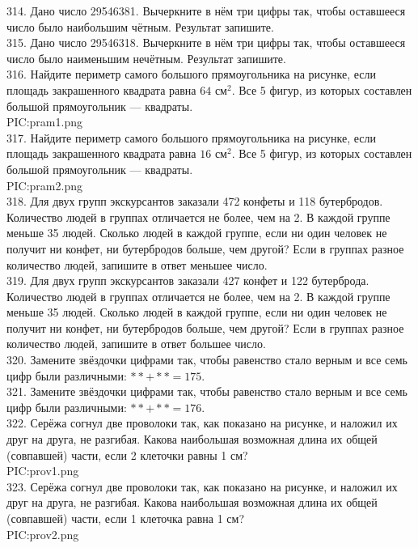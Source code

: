 314. Дано число 29546381. Вычеркните в нём три цифры так, чтобы оставшееся число было наибольшим чётным. Результат запишите.\\
315. Дано число 29546318. Вычеркните в нём три цифры так, чтобы оставшееся число было наименьшим нечётным. Результат запишите.\\
316. Найдите периметр самого большого прямоугольника на рисунке, если площадь закрашенного квадрата равна $64\text{ см}^2.$ Все 5 фигур, из которых составлен большой прямоугольник --- квадраты.\\
{{PIC:pram1.png}}\\
317. Найдите периметр самого большого прямоугольника на рисунке, если площадь закрашенного квадрата равна $16\text{ см}^2.$ Все 5 фигур, из которых составлен большой прямоугольник --- квадраты.\\
{{PIC:pram2.png}}\\
318. Для двух групп экскурсантов заказали 472 конфеты и 118 бутербродов. Количество людей в группах отличается не более, чем на 2. В каждой группе меньше 35 людей. Сколько людей в каждой группе, если ни один человек не получит ни конфет, ни бутербродов больше, чем другой? Если в группах разное количество людей, запишите в ответ меньшее число.\\
319. Для двух групп экскурсантов заказали 427 конфет и 122 бутерброда. Количество людей в группах отличается не более, чем на 2. В каждой группе меньше 35 людей. Сколько людей в каждой группе, если ни один человек не получит ни конфет, ни бутербродов больше, чем другой? Если в группах разное количество людей, запишите в ответ большее число.\\
320. Замените звёздочки цифрами так, чтобы равенство стало верным и все семь цифр были различными: $**+**=175.$\\
321. Замените звёздочки цифрами так, чтобы равенство стало верным и все семь цифр были различными: $**+**=176.$\\
322. Серёжа согнул две проволоки так, как показано на рисунке, и наложил их друг на друга, не разгибая. Какова наибольшая возможная длина их общей (совпавшей) части, если 2 клеточки равны 1 см?\\
{{PIC:prov1.png}}\\
323. Серёжа согнул две проволоки так, как показано на рисунке, и наложил их друг на друга, не разгибая. Какова наибольшая возможная длина их общей (совпавшей) части, если 1 клеточка равна 1 см?\\
{{PIC:prov2.png}}\\
